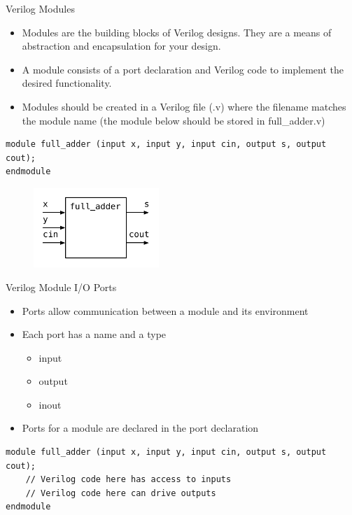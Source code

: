 \documentclass{beamer}
\begin{document}
\begin{frame}[fragile]{Verilog Modules}
	\begin{itemize}
		\item Modules are the building blocks of Verilog designs. They are a means of abstraction and encapsulation for your design.
		\item A module consists of a port declaration and Verilog code to implement the desired functionality.
		\item Modules should be created in a Verilog file (.v) where the filename matches the module name (the module below should be stored in full\_adder.v)
	\end{itemize}
	
\begin{verbatim}
module full_adder (input x, input y, input cin, output s, output cout);
endmodule
\end{verbatim}
	\begin{figure}[H]
	\centering
	\includegraphics[height=3cm]{full_adder.pdf}
	\end{figure}
\end{frame}

\begin{frame}[fragile]{Verilog Module I/O Ports}
	\begin{itemize}
		\item Ports allow communication between a module and its environment
		\item Each port has a name and a type
		\begin{itemize}
			\item input
			\item output
			\item inout
		\end{itemize}
		\item Ports for a module are declared in the port declaration
	\end{itemize}
\begin{verbatim}
module full_adder (input x, input y, input cin, output s, output cout);
	// Verilog code here has access to inputs
	// Verilog code here can drive outputs
endmodule
\end{verbatim}
\end{frame}
\end{document}
